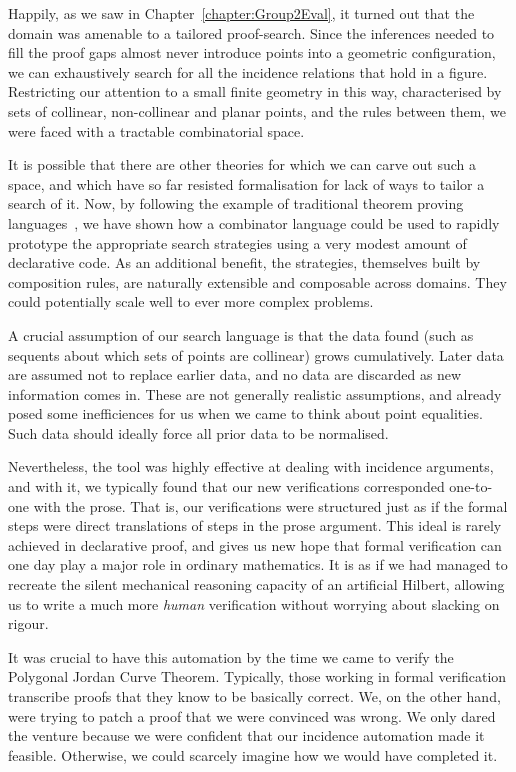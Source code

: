Happily, as we saw in Chapter~\ref{chapter:Group2Eval}, it turned out that the domain was amenable to a tailored proof-search. Since the inferences needed to fill the proof gaps almost never introduce points into a geometric configuration, we can exhaustively search for all the incidence relations that hold in a figure. Restricting our attention to a small finite geometry in this way, characterised by sets of collinear, non-collinear and planar points, and the rules between them, we were faced with a tractable combinatorial space.

It is possible that there are other theories for which we can carve out such a space, and which have so far resisted formalisation for lack of ways to tailor a search of it. Now, by following the example of traditional theorem proving languages~\cite{Tactics}, we have shown how a combinator language could be used to rapidly prototype the appropriate search strategies using a very modest amount of declarative code. As an additional benefit, the strategies, themselves built by composition rules, are naturally extensible and composable across domains. They could potentially scale well to ever more complex problems.

A crucial assumption of our search language is that the data found (such as sequents about which sets of points are collinear) grows cumulatively. Later data are assumed not to replace earlier data, and no data are discarded as new information comes in. These are not generally realistic assumptions, and already posed some inefficiences for us when we came to think about point equalities. Such data should ideally force all prior data to be normalised.

Nevertheless, the tool was highly effective at dealing with incidence arguments, and with it, we typically found that our new verifications corresponded one-to-one with the prose. That is, our verifications were structured just as if the formal steps were direct translations of steps in the prose argument. This ideal is rarely achieved in declarative proof, and gives us new hope that formal verification can one day play a major role in ordinary mathematics. It is as if we had managed to recreate the silent mechanical reasoning capacity of an artificial Hilbert, allowing us to write a much more \emph{human} verification without worrying about slacking on rigour.

It was crucial to have this automation by the time we came to verify the Polygonal Jordan Curve Theorem. Typically, those working in formal verification transcribe proofs that they know to be basically correct. We, on the other hand, were trying to patch a proof that we were convinced was wrong. We only dared the venture because we were confident that our incidence automation made it feasible. Otherwise, we could scarcely imagine how we would have completed it.

